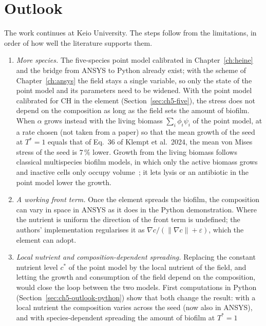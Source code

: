 \section{Outlook}
\label{sec:concl_outlook}

The work continues at Keio University. The steps follow from the limitations,
in order of how well the literature supports them.
\begin{enumerate}
  \item \emph{More species.} The five-species point model calibrated in
        Chapter~\ref{ch:heine} and the bridge from ANSYS to Python already
        exist; with the scheme of Chapter~\ref{ch:ansys} the field stays a
        single variable, so only the state of the point model and its
        parameters need to be widened. With the point model calibrated for CH
        in the element (Section~\ref{sec:ch5-five}), the stress does not
        depend on the composition as long as the field sets the amount of
        biofilm. When
        $\alpha$ grows instead with the living biomass
        $\sum_i\phi_i\psi_i$ of the point model, at a rate chosen (not taken
        from a paper) so that the mean growth of the seed at $T^*=1$ equals
        that of Eq.~36 of Klempt et al.\ 2024, the mean von Mises stress of the
        seed is $7\,\%$ lower. Growth from the living biomass follows classical
        multispecies biofilm models, in which only the active biomass grows and
        inactive cells only occupy volume~\cite{WannerGujer1986}; it lets lysis
        or an antibiotic in the point model lower the growth.
  \item \emph{A working front term.} Once the element spreads the biofilm, the
        composition can vary in space in ANSYS as it does in the Python
        demonstration. Where the nutrient is uniform the direction of the
        front term is undefined; the authors' implementation regularises it
        as $\nabla c/(\|\nabla c\|+\varepsilon)$, which the element can adopt.
  \item \emph{Local nutrient and composition-dependent spreading.} Replacing
        the constant nutrient level $c^*$ of the point model by the local
        nutrient of the field, and letting the growth and consumption of the
        field depend on the composition, would close the loop between the two
        models. First computations in Python
        (Section~\ref{sec:ch5-outlook-python}) show that both change the
        result: with a local nutrient the composition varies across the seed
        (now also in ANSYS), and with species-dependent spreading the amount of biofilm at $T^*=1$

\end{enumerate}
